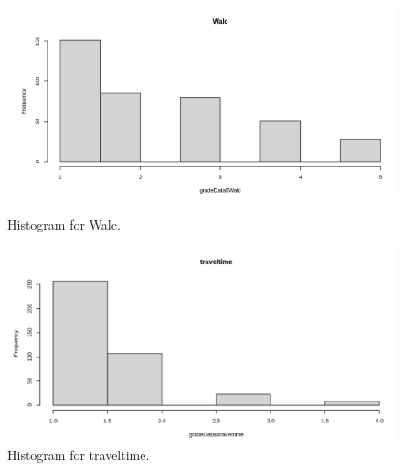 \documentclass[a4paper]{article}
\begin{document}
\begin{figure}[H]
    \centering
    \begin{minipage}{0.5\textwidth}
        \centering
        \includegraphics[width = 1\linewidth]{Images/14.PNG}
        \caption{Histogram for Walc.}
        \label{fig:hist7}
    \end{minipage}%
    \begin{minipage}{0.5\textwidth}
        \centering
        \includegraphics[width = 1\linewidth]{Images/16.PNG}
        \caption{Histogram for traveltime.}
        \label{fig:hist9}
        \end{minipage}
\end{figure}
\end{document}

